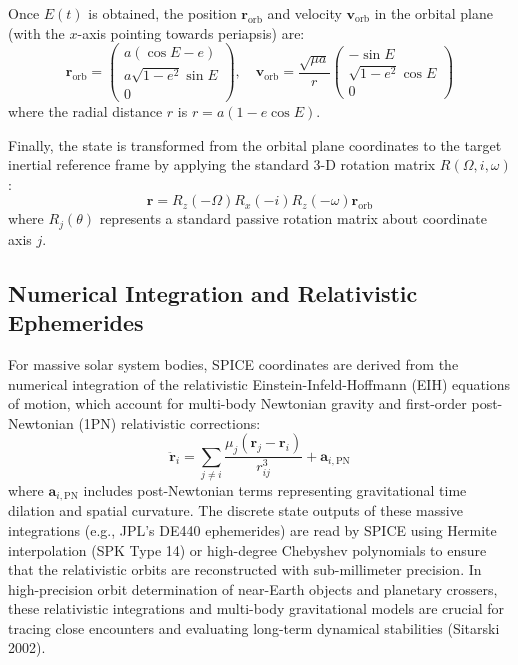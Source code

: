 \documentclass{acta}
\begin{document}
Once $E(t)$ is obtained, the position $\mathbf{r}_{\text{orb}}$ and velocity $\mathbf{v}_{\text{orb}}$ in the orbital plane (with the $x$-axis pointing towards periapsis) are:
\begin{equation}
\mathbf{r}_{\text{orb}} = \begin{pmatrix} a(\cos E - e) \\ a\sqrt{1-e^2}\sin E \\ 0 \end{pmatrix}, \quad
\mathbf{v}_{\text{orb}} = \frac{\sqrt{\mu a}}{r} \begin{pmatrix} -\sin E \\ \sqrt{1-e^2}\cos E \\ 0 \end{pmatrix}
\end{equation}
where the radial distance $r$ is $r = a(1 - e\cos E)$.

Finally, the state is transformed from the orbital plane coordinates to the target inertial reference frame by applying the standard 3-D rotation matrix $R(\Omega, i, \omega)$:
\begin{equation}
\mathbf{r} = R_z(-\Omega) R_x(-i) R_z(-\omega) \mathbf{r}_{\text{orb}}
\end{equation}
where $R_j(\theta)$ represents a standard passive rotation matrix about coordinate axis $j$.

\subsection{Numerical Integration and Relativistic Ephemerides}
For massive solar system bodies, SPICE coordinates are derived from the numerical integration of the relativistic Einstein-Infeld-Hoffmann (EIH) equations of motion, which account for multi-body Newtonian gravity and first-order post-Newtonian (1PN) relativistic corrections:
\begin{equation}
\mathbf{\ddot{r}}_i = \sum_{j \neq i} \frac{\mu_j (\mathbf{r}_j - \mathbf{r}_i)}{r_{ij}^3} + \mathbf{a}_{i,\text{PN}}
\end{equation}
where $\mathbf{a}_{i,\text{PN}}$ includes post-Newtonian terms representing gravitational time dilation and spatial curvature. The discrete state outputs of these massive integrations (e.g., JPL's DE440 ephemerides) are read by SPICE using Hermite interpolation (SPK Type 14) or high-degree Chebyshev polynomials to ensure that the relativistic orbits are reconstructed with sub-millimeter precision. In high-precision orbit determination of near-Earth objects and planetary crossers, these relativistic integrations and multi-body gravitational models are crucial for tracing close encounters and evaluating long-term dynamical stabilities (Sitarski 2002).
\end{document}
